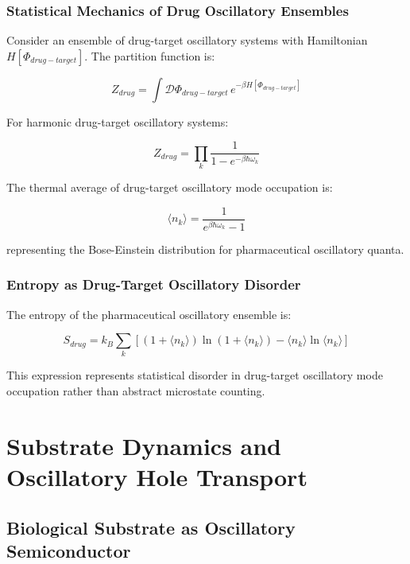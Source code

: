 \documentclass[12pt,a4paper]{article}
\begin{document}
\subsubsection{Statistical Mechanics of Drug Oscillatory Ensembles}

Consider an ensemble of drug-target oscillatory systems with Hamiltonian $H[\Phi_{drug-target}]$. The partition function is:

\begin{equation}
Z_{drug} = \int \mathcal{D}\Phi_{drug-target} \, e^{-\beta H[\Phi_{drug-target}]}
\end{equation}

For harmonic drug-target oscillatory systems:

\begin{equation}
Z_{drug} = \prod_k \frac{1}{1 - e^{-\beta\hbar\omega_k}}
\end{equation}

The thermal average of drug-target oscillatory mode occupation is:

\begin{equation}
\langle n_k\rangle = \frac{1}{e^{\beta\hbar\omega_k} - 1}
\end{equation}

representing the Bose-Einstein distribution for pharmaceutical oscillatory quanta.

\subsubsection{Entropy as Drug-Target Oscillatory Disorder}

The entropy of the pharmaceutical oscillatory ensemble is:

\begin{equation}
S_{drug} = k_B \sum_k \left[(1 + \langle n_k\rangle)\ln(1 + \langle n_k\rangle) - \langle n_k\rangle\ln\langle n_k\rangle\right]
\end{equation}

This expression represents statistical disorder in drug-target oscillatory mode occupation rather than abstract microstate counting.

\section{Substrate Dynamics and Oscillatory Hole Transport}

\subsection{Biological Substrate as Oscillatory Semiconductor}
\end{document}

